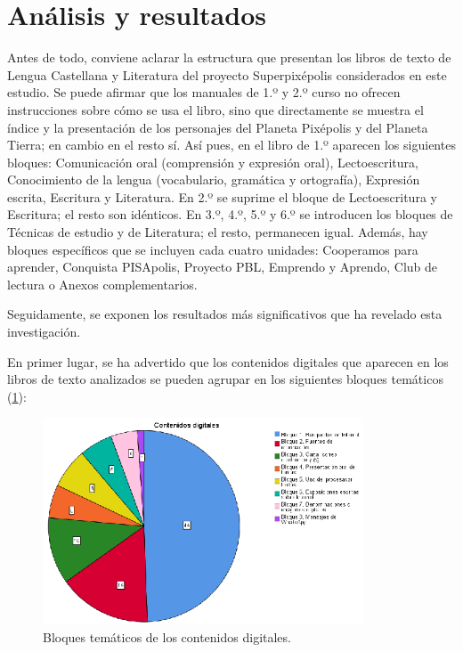 \documentclass[spanish]{textolivre}
\begin{document}

\section{Análisis y resultados}\label{sec-analisis}
Antes de todo, conviene aclarar la estructura que presentan los libros de texto de Lengua Castellana y Literatura del proyecto Superpixépolis considerados en este estudio. Se puede afirmar que los manuales de 1.º y 2.º curso no ofrecen instrucciones sobre cómo se usa el libro, sino que directamente se muestra el índice y la presentación de los personajes del Planeta Pixépolis y del Planeta Tierra; en cambio en el resto sí. Así pues, en el libro de 1.º aparecen los siguientes bloques: Comunicación oral (comprensión y expresión oral), Lectoescritura, Conocimiento de la lengua (vocabulario, gramática y ortografía), Expresión escrita, Escritura y Literatura. En 2.º se suprime el bloque de Lectoescritura y Escritura; el resto son idénticos. En 3.º, 4.º, 5.º y 6.º se introducen los bloques de Técnicas de estudio y de Literatura; el resto, permanecen igual. Además, hay bloques específicos que se incluyen cada cuatro unidades: Cooperamos para aprender, Conquista PISApolis, Proyecto PBL, Emprendo y Aprendo, Club de lectura o Anexos complementarios.

Seguidamente, se exponen los resultados más significativos que ha revelado esta investigación.  

En primer lugar, se ha advertido que los contenidos digitales que aparecen en los libros de texto analizados se pueden agrupar en los siguientes bloques temáticos (\cref{Fig01}):  

\begin{figure}[htbp]
 \centering
 \includegraphics[width=0.85\textwidth]{Fig01.eps}
 \caption{Bloques temáticos de los contenidos digitales.}
 \label{Fig01}
\end{figure}
\end{document}
